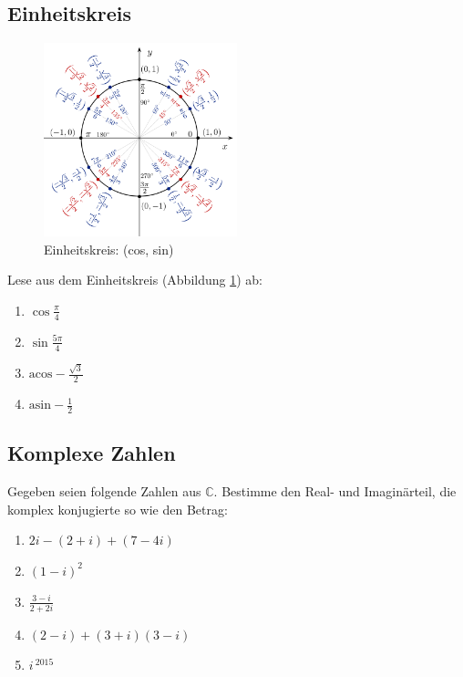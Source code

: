 \documentclass[11pt, a4paper]{article}
\newcommand{\acos}{\mathrm{acos}}
\newcommand{\asin}{\mathrm{asin}}
\begin{document}
\subsection{Einheitskreis}
\begin{figure}[h!]
	\centering
	\includegraphics[width=0.5\textwidth]{Einheitskreis.png}
	\caption{Einheitskreis: (cos, sin)}
	\label{einheitskreis}
\end{figure}

Lese aus dem Einheitskreis (Abbildung \ref{einheitskreis}) ab:
\begin{enumerate}
	\item $\cos \frac{\pi}{4}$
	\item $\sin \frac{5\pi}{4}$
	\item $\acos -\frac{\sqrt{3}}{2}$
	\item $\asin -\frac{1}{2}$
\end{enumerate}

\subsection{Komplexe Zahlen}
Gegeben seien folgende Zahlen aus $\mathbb{C}$. Bestimme den Real- und Imaginärteil, die komplex konjugierte so wie den Betrag:
\begin{enumerate}
	\item $2i - (2 + i) + (7 - 4i)$
	\item $(1-i)^2$
	\item $\frac{3 - i}{2 + 2i}$
	\item $(2 - i) + (3 + i)(3-i)$
	\item $i^{\ 2015}$
\end{enumerate}
\end{document}
